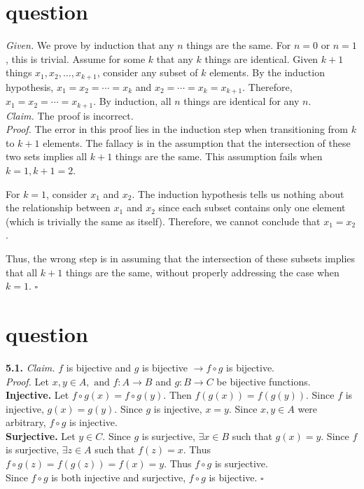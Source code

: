 \documentclass[11pt]{article}
\begin{document}














\section{question}
\emph{Given. } We prove by induction that any \(n\) things are the same. For \(n = 0\) or \(n = 1\), this is trivial. Assume for some \(k\) that any \(k\) things are identical. Given \(k+1\) things \(x_1, x_2, \dots, x_{k+1}\), consider any subset of \(k\) elements. By the induction hypothesis, \(x_1 = x_2 = \cdots = x_k\) and \(x_2 = \cdots = x_k = x_{k+1}\). Therefore, \(x_1 = x_2 = \cdots = x_{k+1}\). By induction, all \(n\) things are identical for any \(n\). \medskip \\
\emph{Claim. } The proof is incorrect. \medskip \\
\emph{Proof. } The error in this proof lies in the induction step when transitioning from \(k\) to \(k+1\) elements. 
The fallacy is in the assumption that the intersection of these two sets implies all $k+1$ things are the same. This assumption fails when $k=1, k+1=2$.

For $k=1$, consider $x_1$ and $x_2$. The induction hypothesis tells us nothing about the relationship between $x_1$ and $x_2$ since each subset contains only one element (which is trivially the same as itself). Therefore, we cannot conclude that $x_1=x_2$.

Thus, the wrong step is in assuming that the intersection of these subsets implies that all $k+1$ things are the same, without properly addressing the case when $k=1$. \hfill $\square$









\section{question}
\noindent \textbf{5.1. } \emph{Claim. } $f$ is bijective and $g$ is bijective $ \to f \circ g$ is bijective. \medskip \\
\emph{Proof. } Let $x, y \in A, \text{ and  }f: A \to B$ and $g: B \to C$ be bijective functions. \\
\textbf{Injective. } Let $f \circ g(x) = f \circ g(y)$. Then $f(g(x)) = f(g(y))$. Since $f$ is injective, $g(x) = g(y)$. Since $g$ is injective, $x = y$. Since $x, y \in A$ were arbitrary, $f \circ g$ is injective. \\
\textbf{Surjective. } Let $y \in C$. Since $g$ is surjective, $\exists x \in B$ such that $g(x) = y$. Since $f$ is surjective, $\exists z \in A$ such that $f(z) = x$. Thus $f \circ g(z) = f(g(z)) = f(x) = y$. Thus $f \circ g$ is surjective. \\
Since $f \circ g$ is both injective and surjective, $f \circ g$ is bijective. \hfill $\square$
\end{document}
